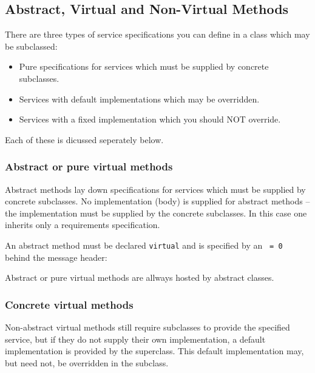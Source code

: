 
\subsection{Abstract, Virtual and Non-Virtual Methods}

There are three types of service specifications you can define in
a class which may be subclassed:
\begin{itemize}
  \item Pure specifications for services which must be supplied by
        concrete subclasses.
  \item Services with default implementations which may be overridden.
  \item Services with a fixed implementation which you should NOT override.
\end{itemize}
Each of these is dicussed seperately below.

  
\subsubsection{Abstract or pure virtual methods}

Abstract methods lay down specifications  for services which must be supplied 
by concrete subclasses. No implementation (body) is supplied for abstract 
methods -- the implementation must be supplied by the concrete subclasses. 
In this case one inherits only a requirements specification.

An abstract method must be declared \verb+virtual+ and is specified by
an \verb+ = 0 + behind the message header:


Abstract or pure virtual methods are allways hosted by abstract classes.


\subsubsection{Concrete virtual methods} 

Non-abstract virtual methods still require subclasses to provide
the specified service, but if they do not supply their own
implementation, a default implementation is provided by the 
superclass. This default implementation may, but need not, be 
overridden in the subclass.

